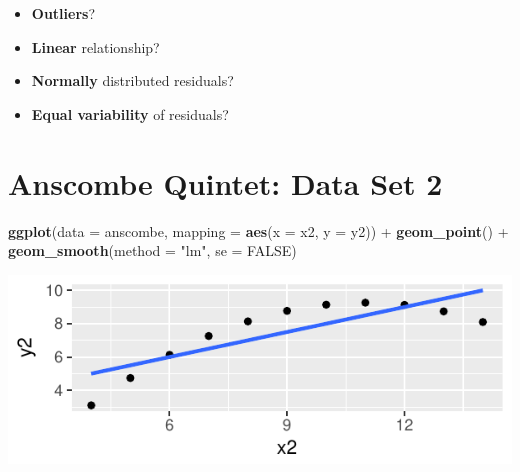 \documentclass[]{article}
\newenvironment{Shaded}{\begin{snugshade}}{\end{snugshade}}
\newcommand{\KeywordTok}[1]{\textcolor[rgb]{0.13,0.29,0.53}{\textbf{{#1}}}}
\newcommand{\DataTypeTok}[1]{\textcolor[rgb]{0.13,0.29,0.53}{{#1}}}
\newcommand{\StringTok}[1]{\textcolor[rgb]{0.31,0.60,0.02}{{#1}}}
\newcommand{\OtherTok}[1]{\textcolor[rgb]{0.56,0.35,0.01}{{#1}}}
\newcommand{\NormalTok}[1]{{#1}}
\providecommand{\tightlist}{%
  \setlength{\itemsep}{0pt}\setlength{\parskip}{0pt}}
\begin{document}
\begin{itemize}
\tightlist
\item
  \textbf{Outliers}?
\end{itemize}

\vspace{1cm}

\begin{itemize}
\tightlist
\item
  \textbf{Linear} relationship?
\end{itemize}

\vspace{1cm}

\begin{itemize}
\tightlist
\item
  \textbf{Normally} distributed residuals?
\end{itemize}

\vspace{1cm}

\begin{itemize}
\tightlist
\item
  \textbf{Equal variability} of residuals?
\end{itemize}

\newpage

\section{Anscombe Quintet: Data Set
2}\label{anscombe-quintet-data-set-2}

\begin{Shaded}
\begin{Highlighting}[]
\KeywordTok{ggplot}\NormalTok{(}\DataTypeTok{data =} \NormalTok{anscombe, }\DataTypeTok{mapping =} \KeywordTok{aes}\NormalTok{(}\DataTypeTok{x =} \NormalTok{x2, }\DataTypeTok{y =} \NormalTok{y2)) +}
\StringTok{  }\KeywordTok{geom_point}\NormalTok{() +}
\StringTok{  }\KeywordTok{geom_smooth}\NormalTok{(}\DataTypeTok{method =} \StringTok{"lm"}\NormalTok{, }\DataTypeTok{se =} \OtherTok{FALSE}\NormalTok{)}
\end{Highlighting}
\end{Shaded}

\includegraphics{20180417_anscombe_residuals_files/figure-latex/unnamed-chunk-6-1.pdf}
\end{document}
